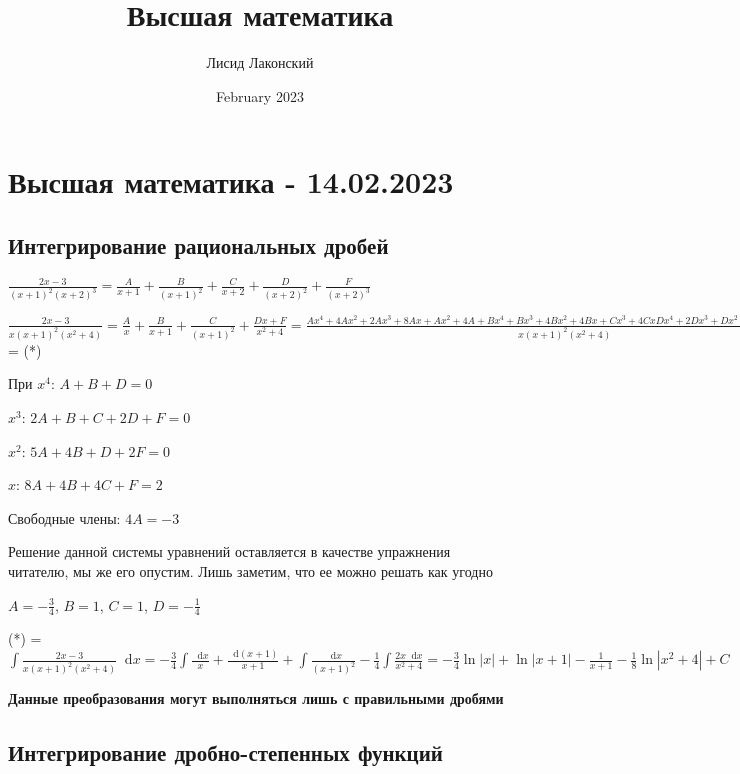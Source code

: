 \documentclass{article}
\title{Высшая математика}
\author{Лисид Лаконский}
\date{February 2023}
\newcommand*\diff{\mathop{}\!\mathrm{d}}
\begin{document}
\raggedright

\maketitle

\tableofcontents
\pagebreak

\section{Высшая математика - 14.02.2023}

\subsection{Интегрирование рациональных дробей}

$
\frac{2x - 3}{(x+1)^2 (x+2)^3} = \frac{A}{x + 1} + \frac{B}{(x + 1)^2} + \frac{C}{x + 2} + \frac{D}{(x + 2)^2} + \frac{F}{(x + 2)^3}
$

\hfill

$
\frac{2x - 3}{x (x + 1)^2 (x^2 + 4)} = \frac{A}{x} + \frac{B}{x + 1} + \frac{C}{(x + 1)^2} + \frac{D x + F}{x^2 + 4} = \frac{A x^4 + 4 A x^2 + 2 A x^3 + 8 A x + A x^2 + 4A + B x^4 + B x^3 + 4 B x^2 + 4 B x + C x^3 + 4 C x D x^4 + 2 D x^3 + D x^2 + F x^3 + 2 F x^2 + F x}{x (x+1)^2 (x^2 + 4)}
$ = (*)

При $x^4$: $A + B + D = 0$

$x^3$: $2A + B + C + 2D + F = 0$

$x^2$: $5A + 4B + D + 2F = 0$

$x$: $8 A + 4 B + 4C + F = 2$

Свободные члены: $4A = -3$

\hfill

Решение данной системы уравнений оставляется в качестве упражнения читателю, мы же его опустим. Лишь заметим, что ее можно решать как угодно

$A = -\frac{3}{4}$, $B = 1$, $C = 1$, $D = - \frac{1}{4}$

\hfill

(*) = $
\int \frac{2x - 3}{x (x + 1)^2 (x^2 + 4)} \diff x = - \frac{3}{4} \int \frac{\diff x}{x} + \frac{\diff (x + 1)}{x + 1} + \int \frac{\diff x}{(x + 1)^2} - \frac{1}{4} \int \frac{2 x \diff x}{x^2 + 4} = -\frac{3}{4} \ln |x| + \ln |x + 1| - \frac{1}{x + 1} - \frac{1}{8} \ln |x^2 + 4| + C
$

\textbf{Данные преобразования могут выполняться лишь с правильными дробями}

\subsection{Интегрирование дробно-степенных функций}
\end{document}
